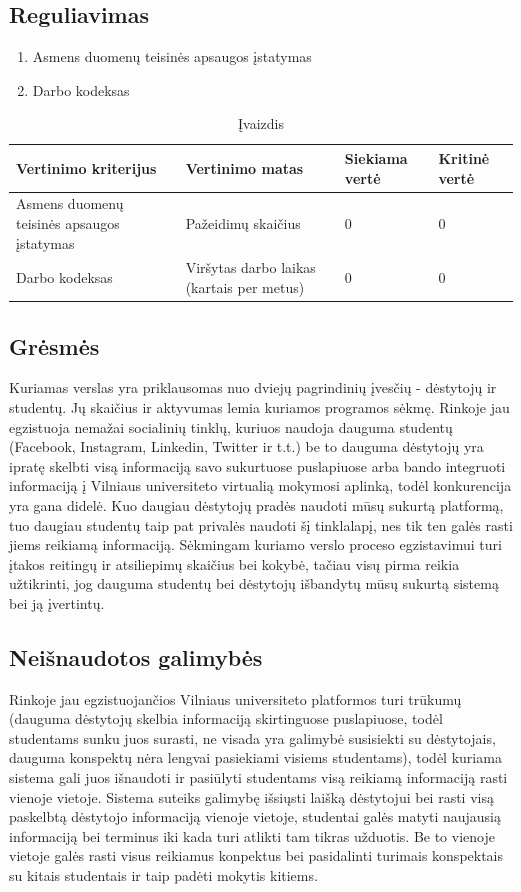 \documentclass{VUMIFPSkursinis}
\begin{document}
	\subsection{Reguliavimas}
\begin{enumerate}
	\item Asmens duomenų teisinės apsaugos įstatymas
	\item Darbo kodeksas
\end{enumerate}
\begin{table}[H]
	\centering
	\caption{Įvaizdis}
	{\begin{tabular}{|p{5cm}|p{}|p{2cm}|p{2cm}|} \hline
			Vertinimo kriterijus & Vertinimo matas & Siekiama vertė & Kritinė vertė \\
			\hline
			Asmens duomenų teisinės apsaugos įstatymas & Pažeidimų skaičius & 0 & 0 \\
			\hline
			Darbo kodeksas & Viršytas darbo laikas (kartais per metus) & 0 & 0 \\
			\hline
	\end{tabular}}
	\label{reguliavimas}
\end{table}
\subsection{Grėsmės}
Kuriamas verslas yra priklausomas nuo dviejų pagrindinių įvesčių - dėstytojų ir studentų. Jų skaičius ir aktyvumas lemia kuriamos programos sėkmę. Rinkoje jau egzistuoja nemažai socialinių tinklų, kuriuos naudoja dauguma studentų (Facebook, Instagram, Linkedin, Twitter ir t.t.) be to dauguma dėstytojų yra ipratę skelbti visą informaciją savo sukurtuose puslapiuose arba bando integruoti informaciją į Vilniaus universiteto virtualią mokymosi aplinką, todėl konkurencija yra gana didelė. Kuo daugiau dėstytojų pradės naudoti mūsų sukurtą platformą, tuo daugiau studentų taip pat privalės naudoti šį tinklalapį, nes tik ten galės rasti jiems reikiamą informaciją. Sėkmingam kuriamo verslo proceso egzistavimui turi įtakos reitingų ir atsiliepimų skaičius bei kokybė, tačiau visų pirma reikia užtikrinti, jog dauguma studentų bei dėstytojų išbandytų mūsų sukurtą sistemą bei ją įvertintų.
\subsection{Neišnaudotos galimybės}
Rinkoje jau egzistuojančios Vilniaus universiteto platformos turi trūkumų (dauguma dėstytojų skelbia informaciją skirtinguose puslapiuose, todėl studentams sunku juos surasti, ne visada yra galimybė susisiekti su dėstytojais, dauguma konspektų nėra lengvai pasiekiami visiems studentams), todėl kuriama sistema gali juos išnaudoti ir pasiūlyti studentams visą reikiamą informaciją rasti vienoje vietoje. Sistema suteiks galimybę išsiųsti laišką dėstytojui bei rasti visą paskelbtą dėstytojo informaciją vienoje vietoje, studentai galės matyti naujausią informaciją bei terminus iki kada turi atlikti tam tikras užduotis. Be to vienoje vietoje galės rasti visus reikiamus konpektus bei pasidalinti turimais konspektais su kitais studentais ir taip padėti mokytis kitiems.
\newpage
\end{document}
